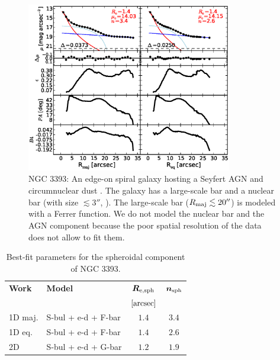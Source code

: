 \documentclass[preprint2]{emulateapj}
\newcommand{\fitfigurewidth}{0.8\textwidth}
\begin{document}
  \begin{figure}[h]
  \begin{center}
  \includegraphics[width=\fitfigurewidth]{n3393_1Dfit.eps}
  \caption{NGC 3393: 
  An edge-on spiral galaxy hosting a Seyfert AGN \citep{diaz1988n3393} and 
  circumnuclear dust \citep{martini2003}.
  The galaxy has a large-scale bar and a nuclear bar (with size $\lesssim 3''$, \citealt{erwin2004}).  
  The large-scale bar ($R_{\rm maj} \lesssim 20''$) is modeled with a Ferrer function.
  We do not model the nuclear bar and the AGN component because the poor spatial resolution of the data does not allow to fit them.
  }
  \end{center}
  \end{figure}

  \begin{table}[h]
  \small
  \caption{Best-fit parameters for the spheroidal component of NGC 3393.}
  \begin{center}
  \begin{tabular}{llcc}
  \hline
  {\bf Work} & {\bf Model}   & $\bm R_{\rm e,sph}$    & $\bm n_{\rm sph}$ \\
    &  &  $[\rm arcsec]$ & \\
  \hline
  1D maj. & S-bul + e-d + F-bar & $1.4$  &  $3.4$ \\
  1D eq.  & S-bul + e-d + F-bar & $1.4$  &  $2.6$ \\
  2D      & S-bul + e-d + G-bar & $1.2$  &  $1.9$ \\
  \hline
  \end{tabular}
  \end{center}
  \label{tab:n3393}
  \end{table}
\end{document}
